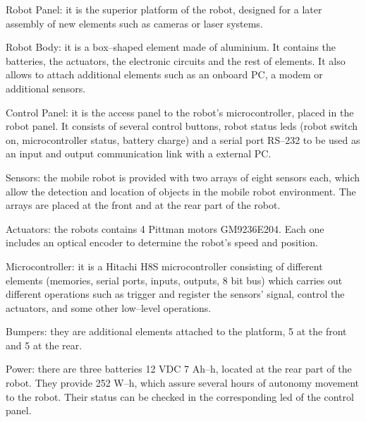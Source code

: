 \begin{description}
\item Robot Panel: it is the superior platform of the robot, designed for a later assembly of new elements such as cameras or laser systems. 
\item Robot Body: it is a box--shaped element made of aluminium. It contains the batteries, the actuators, the electronic circuits and the rest of elements. It also allows to attach additional elements such as an onboard PC, a modem or additional sensors.
\item Control Panel: it is the access panel to the robot's microcontroller, placed in the robot panel. It consists of several control buttons, robot status leds (robot switch on, microcontroller status, battery charge) and a serial port RS--232 to be used as an input and output communication link with a external PC.
\item Sensors: the mobile robot is provided with two arrays of eight sensors each, which allow the detection and location of objects in the mobile robot environment. The arrays are placed at the front and at the rear part of the robot.
\item Actuators: the robots contains 4 Pittman motors GM9236E204. Each one includes an optical encoder to determine the robot's speed and position. 
\item Microcontroller: it is a Hitachi H8S microcontroller consisting of different elements (memories, serial ports, inputs, outputs, 8 bit bus) which carries out different operations such as trigger and register the sensors' signal, control the actuators, and some other low--level operations.
\item Bumpers: they are additional elements attached to the platform, 5 at the front and 5 at the rear.
\item Power: there are three batteries 12 VDC 7 Ah--h, located at the rear part of the robot. They provide 252 W--h, which assure several hours of autonomy movement to the robot. Their status can be checked in the corresponding led of the control panel.
\end{description}

